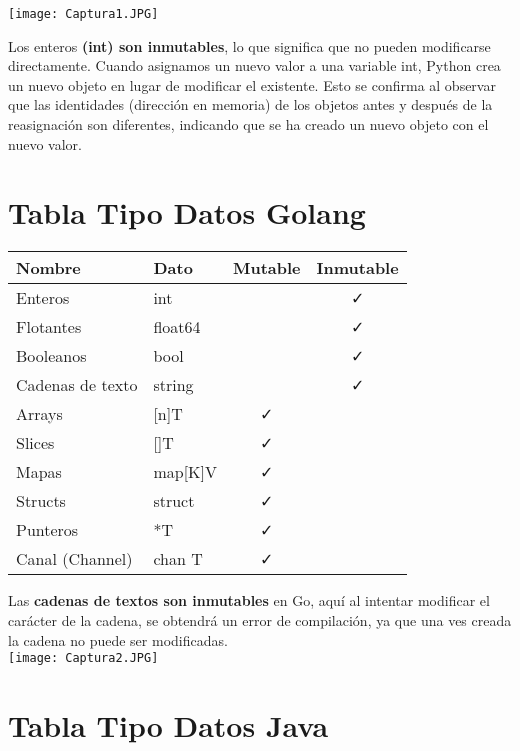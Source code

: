 \documentclass{article}
\begin{document}
\begin{minipage}{0.6\textwidth}
  \centering
  \texttt{[image: Captura1.JPG]}
\end{minipage}
\hfill
\begin{minipage}{0.5\textwidth}
Los enteros \textbf{(int) son inmutables}, lo que significa que no pueden modificarse directamente. Cuando asignamos un nuevo valor a una variable int, Python crea un nuevo objeto en lugar de modificar el existente. Esto se confirma al observar que las identidades (dirección en memoria) de los objetos antes y después de la reasignación son diferentes, indicando que se ha creado un nuevo objeto con el nuevo valor.
\end{minipage}
\newpage
\section{Tabla Tipo Datos Golang}
\begin{table}[htbp]
    \centering
    \begin{tabular}{|p{4cm}|p{3cm}|c|c|}
    \hline
    \textbf{Nombre} & \textbf{Dato} & \textbf{Mutable} & \textbf{Inmutable} \\
    \hline
    Enteros & int &  & \faCheck \\
    Flotantes & float64 &  & \faCheck \\
    Booleanos & bool &  & \faCheck \\
    Cadenas de texto & string &  & \faCheck \\
    Arrays & [n]T & \faCheck & \\
    Slices & []T & \faCheck & \\
    Mapas & map[K]V & \faCheck & \\
    Structs & struct{} & \faCheck & \\
    Punteros & *T & \faCheck & \\
    Canal (Channel) & chan T & \faCheck & \\
 \hline
    \end{tabular}
    \label{tab:ejemplo}
\end{table}
    Las \textbf{cadenas de textos son inmutables} en Go, aquí al intentar modificar el carácter de la cadena, se obtendrá un error de compilación,
    ya que una ves creada la cadena no puede ser modificadas.\\
\texttt{[image: Captura2.JPG]}

\newpage
\section{Tabla Tipo Datos Java}
\end{document}
